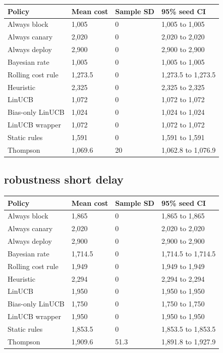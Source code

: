 \documentclass[
  10pt,
]{article}
\begin{document}
\par\medskip\noindent\begin{minipage}{\linewidth}\centering
\begin{tabular}{@{}llll@{}}
\toprule\noalign{}
Policy & Mean cost & Sample SD & 95\% seed CI \\
\midrule\noalign{}
Always block & 1,005 & 0 & 1,005 to 1,005 \\
Always canary & 2,020 & 0 & 2,020 to 2,020 \\
Always deploy & 2,900 & 0 & 2,900 to 2,900 \\
Bayesian rate & 1,005 & 0 & 1,005 to 1,005 \\
Rolling cost rule & 1,273.5 & 0 & 1,273.5 to 1,273.5 \\
Heuristic & 2,325 & 0 & 2,325 to 2,325 \\
LinUCB & 1,072 & 0 & 1,072 to 1,072 \\
Bias-only LinUCB & 1,024 & 0 & 1,024 to 1,024 \\
LinUCB wrapper & 1,072 & 0 & 1,072 to 1,072 \\
Static rules & 1,591 & 0 & 1,591 to 1,591 \\
Thompson & 1,069.6 & 20 & 1,062.8 to 1,076.9 \\
\bottomrule
\end{tabular}
\end{minipage}\par\medskip

\subsection{robustness short delay}\label{robustness-short-delay}

\par\medskip\noindent\begin{minipage}{\linewidth}\centering
\begin{tabular}{@{}llll@{}}
\toprule\noalign{}
Policy & Mean cost & Sample SD & 95\% seed CI \\
\midrule\noalign{}
Always block & 1,865 & 0 & 1,865 to 1,865 \\
Always canary & 2,020 & 0 & 2,020 to 2,020 \\
Always deploy & 2,900 & 0 & 2,900 to 2,900 \\
Bayesian rate & 1,714.5 & 0 & 1,714.5 to 1,714.5 \\
Rolling cost rule & 1,949 & 0 & 1,949 to 1,949 \\
Heuristic & 2,294 & 0 & 2,294 to 2,294 \\
LinUCB & 1,950 & 0 & 1,950 to 1,950 \\
Bias-only LinUCB & 1,750 & 0 & 1,750 to 1,750 \\
LinUCB wrapper & 1,950 & 0 & 1,950 to 1,950 \\
Static rules & 1,853.5 & 0 & 1,853.5 to 1,853.5 \\
Thompson & 1,909.6 & 51.3 & 1,891.8 to 1,927.9 \\
\bottomrule
\end{tabular}
\end{minipage}\par\medskip
\end{document}
